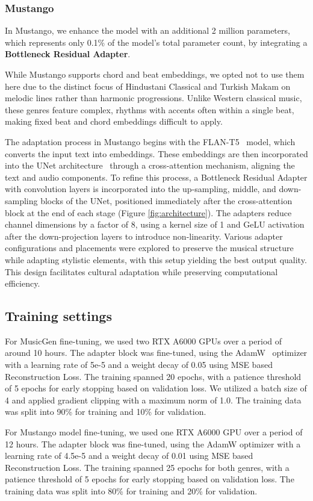 \subsubsection{Mustango}
In Mustango, we enhance the model with an additional 2 million parameters, which represents only 0.1\% of the model's total parameter count, by integrating a \textbf{Bottleneck Residual Adapter}. 

While Mustango supports chord and beat embeddings, we opted not to use them here due to the distinct focus of Hindustani Classical and Turkish Makam on melodic lines rather than harmonic progressions. Unlike Western classical music, these genres feature complex, rhythms with accents often within a single beat, making fixed beat and chord embeddings difficult to apply.

The adaptation process in Mustango begins with the FLAN-T5~\cite{flan-t5} model, which converts the input text into embeddings. These embeddings are then incorporated into the UNet architecture~\cite{10.1007/978-3-319-24574-4_28} through a cross-attention mechanism, aligning the text and audio components. To refine this process, a Bottleneck Residual Adapter with convolution layers is incorporated into the up-sampling, middle, and down-sampling blocks of the UNet, positioned immediately after the cross-attention block at the end of each stage (Figure \ref{fig:architecture}). The adapters reduce channel dimensions by a factor of 8, using a kernel size of 1 and GeLU activation after the down-projection layers to introduce non-linearity. Various adapter configurations and placements were explored to preserve the musical structure while adapting stylistic elements, with this setup yielding the best output quality. This design facilitates cultural adaptation while preserving computational efficiency. 

\subsection{Training settings}
For MusicGen fine-tuning, we used two RTX A6000 GPUs over a period of around 10 hours. The adapter block was fine-tuned, using the AdamW~\cite{Loshchilov2017DecoupledWD} optimizer with a learning rate of 5e-5 and a weight decay of 0.05 using MSE based Reconstruction Loss. The training spanned 20 epochs, with a patience threshold of 5 epochs for early stopping based on validation loss. We utilized a batch size of 4 and applied gradient clipping with a maximum norm of 1.0. The training data was split into 90\% for training and 10\% for validation.

For Mustango model fine-tuning, we used one RTX A6000 GPU over a period of 12 hours.  The adapter block was fine-tuned, using the AdamW optimizer with a learning rate of 4.5e-5 and a weight decay of 0.01 using MSE based Reconstruction Loss. The training spanned 25 epochs for both genres, with a patience threshold of 5 epochs for early stopping based on validation loss. The training data was split into 80\% for training and 20\% for validation. 